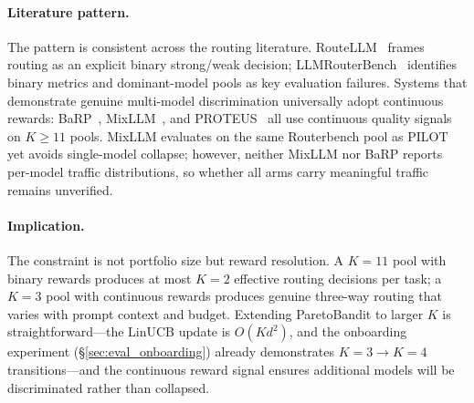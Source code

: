 \paragraph{Literature pattern.}
The pattern is consistent across the routing literature.  RouteLLM~\cite{ong2024routellm} frames routing as an explicit binary strong/weak decision; LLMRouterBench~\cite{li2026llmrouterbench} identifies binary metrics and dominant-model pools as key evaluation failures.  Systems that demonstrate genuine multi-model discrimination universally adopt continuous rewards: BaRP~\cite{wang2025barp}, MixLLM~\cite{wang2025mixllm}, and PROTEUS~\cite{bhatti2026proteus} all use continuous quality signals on $K{\geq}11$ pools.  MixLLM evaluates on the same Routerbench pool as PILOT yet avoids single-model collapse; however, neither MixLLM nor BaRP reports per-model traffic distributions, so whether all arms carry meaningful traffic remains unverified.

\paragraph{Implication.}
The constraint is not portfolio size but reward resolution.  A $K{=}11$ pool with binary rewards produces at most $K{=}2$ effective routing decisions per task; a $K{=}3$ pool with continuous rewards produces genuine three-way routing that varies with prompt context and budget.  Extending ParetoBandit to larger $K$ is straightforward---the LinUCB update is $O(Kd^2)$, and the onboarding experiment (\S\ref{sec:eval_onboarding}) already demonstrates $K{=}3 \to K{=}4$ transitions---and the continuous reward signal ensures additional models will be discriminated rather than collapsed.
